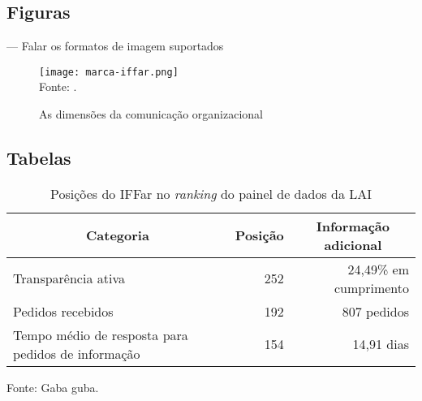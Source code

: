 \subsection{Figuras}
  --- Falar os formatos de imagem suportados
  \begin{figure}[H]
    \centering\singlespacing
    \caption{As dimensões da comunicação organizacional}
    \label{figura:marca-iffar}
    \texttt{[image: marca-iffar.png]}\\
    \footnotesize
    Fonte: \textcite{iffar-identidade-visual-2021}.
  \end{figure}
  
\subsection{Tabelas}
\begin{table}[H]
  \centering\singlespacing

  \caption{Posições do IFFar no \textit{ranking} do painel de dados da LAI}
  \label{tabela:cgu-iffar}
  \begin{tabularx}{12cm}
    {X r r} %
    \hline
    \multicolumn{1}{c}{\textbf{Categoria}}    &   
    \multicolumn{1}{c}{\textbf{Posição}}  & 
    \multicolumn{1}{c}{\textbf{Informação adicional}} \\
    \hline

    Transparência ativa &
    252\textordmasculine{} &
    24,49\% em cumprimento \\

    Pedidos recebidos &
    192\textordmasculine{} &
    807 pedidos \\

    Tempo médio de resposta para pedidos de informação       &   
    154\textordmasculine{} &
    14,91 dias \\
    \hline

  \end{tabularx}

\hspace{\fill}

\footnotesize

Fonte: Gaba guba.
\end{table}

